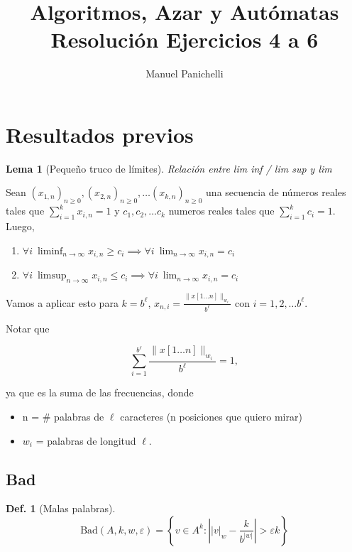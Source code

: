 \documentclass{article}
\author{Manuel Panichelli}
\title{Algoritmos, Azar y Autómatas\\Resolución Ejercicios 4 a 6}
\theoremstyle{definition} %
\newtheorem{lemma}{Lema}
\newtheorem{definition}{Def.}
\begin{document}
\maketitle

\section*{Resultados previos}


\begin{lemma}[Pequeño truco de límites]\label{lemma:lim-trick}
    \textit{Relación entre lim inf / lim sup y lim}


    Sean $(x_{1, n})_{n\geq0}, (x_{2, n})_{n\geq0},\dots (x_{k, n})_{n\geq0}$
    una secuencia de números reales tales que $\sum_{i=1}^{k} x_{i, n} = 1$ y
    $c_1, c_2, \dots c_k$ numeros reales tales que $\sum_{i=1}^{k} c_i = 1$.
    Luego,
    
    \begin{enumerate}
        \item $\forall i\ \liminf_{n\to \infty} x_{i, n} \geq c_i
        \implies \forall i\ \lim_{n\to \infty} x_{i, n} = c_i$

        \item $\forall i\ \limsup_{n\to \infty} x_{i, n} \leq c_i
        \implies \forall i\ \lim_{n\to \infty} x_{i, n} = c_i$
    \end{enumerate}

    Vamos a aplicar esto para $k = b^\ell$, 
    $x_{n, i} = \frac{\|x[1\dots n]\|_{w_i}}{b^\ell}$ con $i = 1, 2, \dots b^\ell$.
    
    Notar que
    
    $$\sum_{i=1}^{b^\ell} \frac{\|x[1\dots n]\|_{w_i}}{b^\ell} = 1,$$
    
    ya que es la suma de las frecuencias, donde

    \begin{itemize}
        \item n = \# palabras de $\ell$ caracteres (n posiciones que quiero mirar)
        \item $w_i$ = palabras de longitud $\ell$.
    \end{itemize}
\end{lemma}

\subsection{Bad}

\begin{definition}[Malas palabras]
    \[
        \text{Bad}(A, k, w, \varepsilon) = \left\{
            v \in A^k : \left|
                |v|_w - \frac{k}{b^{|w|}}
            \right| > \varepsilon k
        \right\}
    \]
\end{definition}
\end{document}

